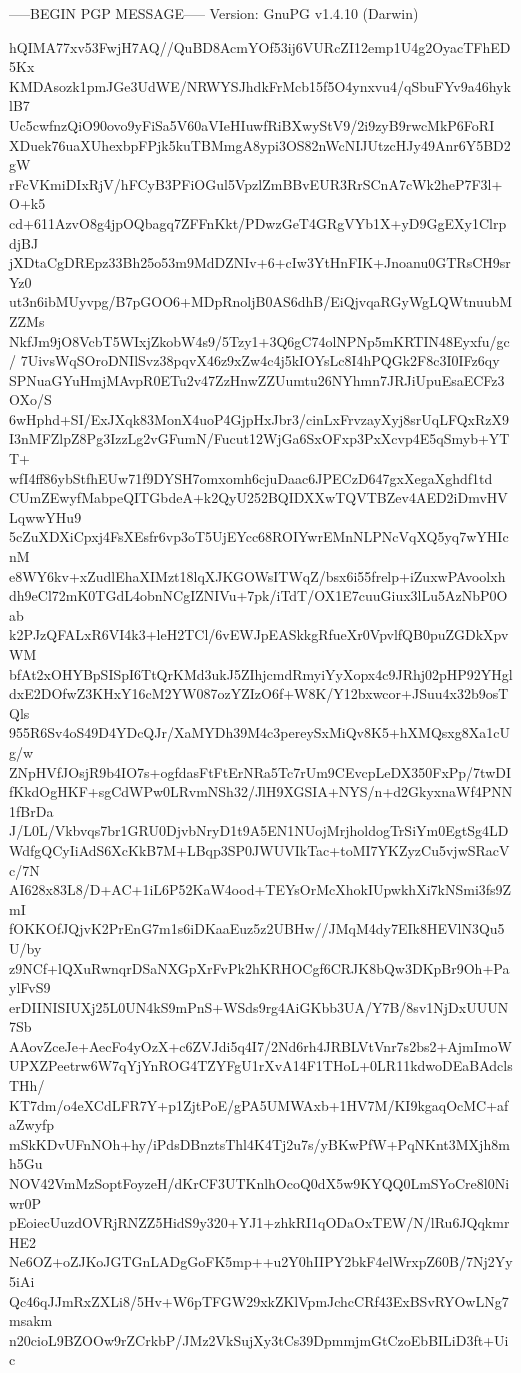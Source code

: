 -----BEGIN PGP MESSAGE-----
Version: GnuPG v1.4.10 (Darwin)

hQIMA77xv53FwjH7AQ//QuBD8AcmYOf53ij6VURcZI12emp1U4g2OyacTFhED5Kx
KMDAsozk1pmJGe3UdWE/NRWYSJhdkFrMcb15f5O4ynxvu4/qSbuFYv9a46hyklB7
Uc5cwfnzQiO90ovo9yFiSa5V60aVIeHIuwfRiBXwyStV9/2i9zyB9rwcMkP6FoRI
XDuek76uaXUhexbpFPjk5kuTBMmgA8ypi3OS82nWcNIJUtzcHJy49Anr6Y5BD2gW
rFcVKmiDIxRjV/hFCyB3PFiOGul5VpzlZmBBvEUR3RrSCnA7cWk2heP7F3l+O+k5
cd+611AzvO8g4jpOQbagq7ZFFnKkt/PDwzGeT4GRgVYb1X+yD9GgEXy1ClrpdjBJ
jXDtaCgDREpz33Bh25o53m9MdDZNIv+6+cIw3YtHnFIK+Jnoanu0GTRsCH9srYz0
ut3n6ibMUyvpg/B7pGOO6+MDpRnoljB0AS6dhB/EiQjvqaRGyWgLQWtnuubMZZMs
NkfJm9jO8VcbT5WIxjZkobW4s9/5Tzy1+3Q6gC74olNPNp5mKRTIN48Eyxfu/gc/
7UivsWqSOroDNIlSvz38pqvX46z9xZw4c4j5kIOYsLc8I4hPQGk2F8c3I0IFz6qy
SPNuaGYuHmjMAvpR0ETu2v47ZzHnwZZUumtu26NYhmn7JRJiUpuEsaECFz3OXo/S
6wHphd+SI/ExJXqk83MonX4uoP4GjpHxJbr3/cinLxFrvzayXyj8srUqLFQxRzX9
I3nMFZlpZ8Pg3IzzLg2vGFumN/Fucut12WjGa6SxOFxp3PxXcvp4E5qSmyb+YTT+
wfI4ff86ybStfhEUw71f9DYSH7omxomh6cjuDaac6JPECzD647gxXegaXghdf1td
CUmZEwyfMabpeQITGbdeA+k2QyU252BQIDXXwTQVTBZev4AED2iDmvHVLqwwYHu9
5cZuXDXiCpxj4FsXEsfr6vp3oT5UjEYcc68ROIYwrEMnNLPNcVqXQ5yq7wYHIcnM
e8WY6kv+xZudlEhaXIMzt18lqXJKGOWsITWqZ/bsx6i55frelp+iZuxwPAvoolxh
dh9eCl72mK0TGdL4obnNCgIZNIVu+7pk/iTdT/OX1E7cuuGiux3lLu5AzNbP0Oab
k2PJzQFALxR6VI4k3+leH2TCl/6vEWJpEASkkgRfueXr0VpvlfQB0puZGDkXpvWM
bfAt2xOHYBpSISpI6TtQrKMd3ukJ5ZIhjcmdRmyiYyXopx4c9JRhj02pHP92YHgl
dxE2DOfwZ3KHxY16cM2YW087ozYZIzO6f+W8K/Y12bxwcor+JSuu4x32b9osTQls
955R6Sv4oS49D4YDcQJr/XaMYDh39M4c3pereySxMiQv8K5+hXMQsxg8Xa1cUg/w
ZNpHVfJOsjR9b4IO7s+ogfdasFtFtErNRa5Tc7rUm9CEvcpLeDX350FxPp/7twDI
fKkdOgHKF+sgCdWPw0LRvmNSh32/JlH9XGSIA+NYS/n+d2GkyxnaWf4PNN1fBrDa
J/L0L/Vkbvqs7br1GRU0DjvbNryD1t9A5EN1NUojMrjholdogTrSiYm0EgtSg4LD
WdfgQCyIiAdS6XcKkB7M+LBqp3SP0JWUVIkTac+toMI7YKZyzCu5vjwSRacVc/7N
AI628x83L8/D+AC+1iL6P52KaW4ood+TEYsOrMcXhokIUpwkhXi7kNSmi3fs9ZmI
fOKKOfJQjvK2PrEnG7m1s6iDKaaEuz5z2UBHw//JMqM4dy7EIk8HEVlN3Qu5U/by
z9NCf+lQXuRwnqrDSaNXGpXrFvPk2hKRHOCgf6CRJK8bQw3DKpBr9Oh+PaylFvS9
erDIINISIUXj25L0UN4kS9mPnS+WSds9rg4AiGKbb3UA/Y7B/8sv1NjDxUUUN7Sb
AAovZceJe+AecFo4yOzX+c6ZVJdi5q4I7/2Nd6rh4JRBLVtVnr7s2bs2+AjmImoW
UPXZPeetrw6W7qYjYnROG4TZYFgU1rXvA14F1THoL+0LR11kdwoDEaBAdclsTHh/
KT7dm/o4eXCdLFR7Y+p1ZjtPoE/gPA5UMWAxb+1HV7M/KI9kgaqOcMC+afaZwyfp
mSkKDvUFnNOh+hy/iPdsDBnztsThl4K4Tj2u7s/yBKwPfW+PqNKnt3MXjh8mh5Gu
NOV42VmMzSoptFoyzeH/dKrCF3UTKnlhOcoQ0dX5w9KYQQ0LmSYoCre8l0Niwr0P
pEoiecUuzdOVRjRNZZ5HidS9y320+YJ1+zhkRI1qODaOxTEW/N/lRu6JQqkmrHE2
Ne6OZ+oZJKoJGTGnLADgGoFK5mp++u2Y0hIIPY2bkF4elWrxpZ60B/7Nj2Yy5iAi
Qc46qJJmRxZXLi8/5Hv+W6pTFGW29xkZKlVpmJchcCRf43ExBSvRYOwLNg7msakm
n20cioL9BZOOw9rZCrkbP/JMz2VkSujXy3tCs39DpmmjmGtCzoEbBILiD3ft+Uic
